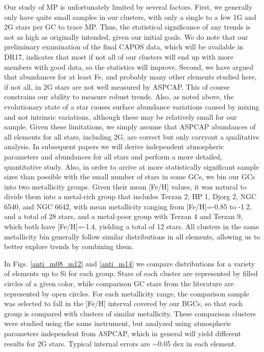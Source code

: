 \documentclass[onecolumn]{aa}
\begin{document}
Our study of MP is unfortunately limited by several factors. First, we generally only have quite small samples in our clusters, with only a single to a few 1G and 2G stars per GC to trace MP. Thus, the statistical significance of any trends is not as high as originally intended, given our initial goals. We do note that our preliminary examination of the final CAPOS data, which will be available in DR17, indicates that most if not all of our clusters will end up with more members with good data, so the statistics will improve.
Second, we have argued that abundances for at least Fe, and probably many other elements studied here, if not all,  in 2G stars are not well measured by ASPCAP. This of course constrains our ability to measure robust trends. Also, as noted above, the evolutionary state of a star causes surface abundance variations caused by mixing and not intrinsic variations, although these may be relatively small for our sample.
Given these limitations, we
simply assume that ASPCAP abundances of all elements for all stars, including 2G, are correct but only carryout a qualitative analysis. In subsequent papers we will derive independent atmospheric parameters and abundances for all stars and perform a more detailed, quantitative study. Also, in order to arrive at more statistically significant sample sizes than possible with the small number of stars in some GCs, we bin our GCs into two metallicity groups. Given their mean [Fe/H] values, it was
natural to divide  them into a metal-rich  group that  includes Terzan 2, HP 1, Djorg 2, NGC 6540, and NGC 6642, with  mean metallicity ranging from  [Fe/H]=-0.85 to -1.2, and a total of 28 stars, and a  metal-poor group with Terzan 4 and Terzan 9, which both have [Fe/H]=-1.4,
yielding a total of 12 stars. 
All clusters in the same metallicity bin generally follow similar distributions in all elements, allowing us to better explore trends by combining them.

In Figs. \ref{anti_m08_m12} and \ref{anti_m14} we compare distributions for a variety of elements up to Si for each group. Stars of each cluster are represented by filled circles of a given color, while comparison GC stars from the literature \citep{Masseron2019} are represented by open circles. For each metallicity range, the comparison sample was selected to fall in the [Fe/H] interval covered by our BGCs, so that each group is compared with clusters of similar metallicity.
These comparison clusters were studied using the same instrument, but analyzed using atmospheric parameters independent from ASPCAP, which in general will yield different results for 2G stars. 
Typical internal errors are $\sim$0.05 dex in each element.
\end{document}
